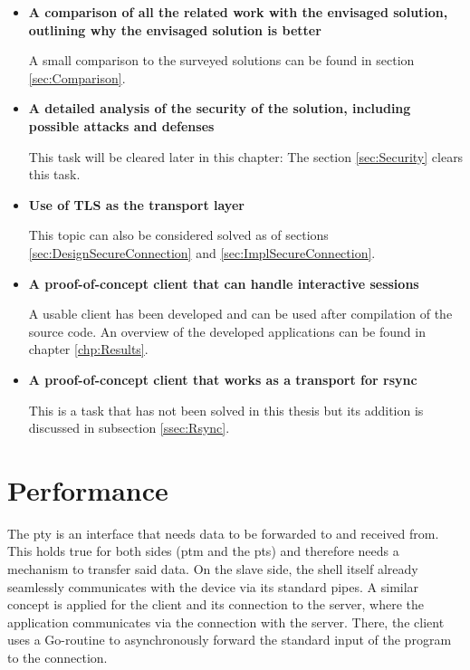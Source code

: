 \documentclass[10pt,a4paper,titlepage,twoside,english,final]{zhawreprt}
\begin{document}
\begin{itemize}
\item \textbf{A comparison of all the related work with the envisaged solution, outlining why the envisaged solution is better}

A small comparison to the surveyed solutions can be found in section \ref{sec:Comparison}.

\item \textbf{A detailed analysis of the security of the solution, including
possible attacks and defenses}

This task will be cleared later in this chapter: The section \ref{sec:Security} clears this task.

\item \textbf{Use of TLS as the transport layer}

This topic can also be considered solved as of sections \ref{sec:DesignSecureConnection} and \ref{sec:ImplSecureConnection}.

\item \textbf{A proof-of-concept client that can handle interactive sessions}

A usable client has been developed and can be used after compilation of the source code.
An overview of the developed applications can be found in chapter \ref{chp:Results}.

\item \textbf{A proof-of-concept client that works as a transport for rsync}

This is a task that has not been solved in this thesis but its addition is discussed in subsection \ref{ssec:Rsync}.
\end{itemize}



\section{Performance}\label{sec:Performance}
The \gls{pty} is an interface that needs data to be forwarded to and received from.
This holds true for both sides (\gls{ptm} and the \gls{pts}) and therefore needs a mechanism to transfer said data.
On the slave side, the \gls{shell} itself already seamlessly communicates with the device via its standard pipes.
A similar concept is applied for the client and its connection to the server, where the application communicates via the connection with the server.
There, the client uses a \gls{Go}-routine to asynchronously forward the standard input of the program to the connection.
\end{document}
